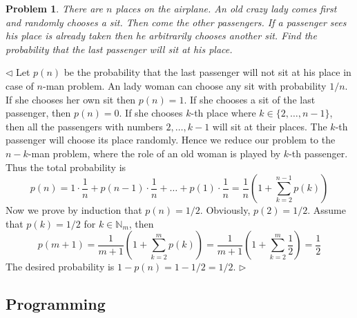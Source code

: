 \documentclass[12pt]{article}
\newtheorem{problem}{Problem}[subsection]
\newenvironment{solution}{\par $\triangleleft$}{$\triangleright$}
\begin{document}
\begin{problem} There are $n$ places on the airplane. An old crazy lady comes
first and randomly chooses a sit. Then come the other passengers. If a passenger
sees his place is already taken then he arbitrarily chooses another sit. Find
the probability that the last passenger will sit at his place.
\end{problem}
\begin{solution} Let $p(n)$ be the probability that the last passenger will not
    sit at his place in case of $n$-man problem. An lady woman can choose any
    sit with probability $1/n$. If she chooses her own sit then $p(n) = 1$. If
    she chooses a sit of the last passenger, then $p(n) = 0$. If she chooses
    $k$-th place where $k\in \{2,\ldots,n-1\}$, then all the passengers with
    numbers $2,\ldots, k-1$ will sit at their places. The $k$-th passenger will
    choose its place randomly. Hence we reduce our problem to the $n-k$-man
    problem, where the role of an old woman is played by $k$-th passenger. Thus
    the total probability is
    $$
        p(n)=1\cdot\frac{1}{n}+p(n-1)\cdot\frac{1}{n}
        +\ldots
        +p(1)\cdot\frac{1}{n}
        =\frac{1}{n}\left(1+\sum_{k=2}^{n-1} p(k)\right)
    $$
    Now we prove by induction that $p(n)=1/2$. Obviously, $p(2)=1/2$. Assume
    that $p(k)=1/2$ for $k\in\mathbb{N}_m$, then
    $$
        p(m+1)=\frac{1}{m+1}\left(1+\sum_{k=2}^{m}p(k)\right)
        =\frac{1}{m+1}\left(1+\sum_{k=2}^{m}\frac{1}{2}\right)=\frac{1}{2}
    $$
    The desired probability is $1-p(n)=1-1/2=1/2$.
\end{solution}











\newpage

\subsection{Programming}
\end{document}

